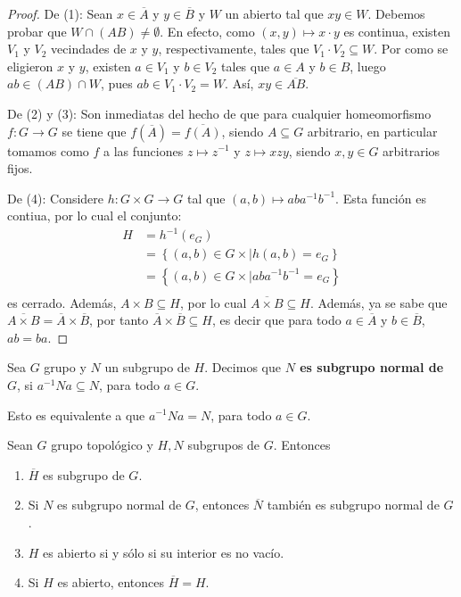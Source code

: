 \documentclass[12pt]{report}
\theoremstyle{largebreak}
\newcommand{\cf}[3]{\ensuremath{#1:#2\rightarrow#3}}
\newcommand{\Cls}[1]{\ensuremath{\overline{#1}}}
\begin{document}
    \begin{proof}
        De (1): Sean $x\in \Cls{A}$ y $y\in \Cls{B}$ y $W$ un abierto tal que $xy\in W$. Debemos probar que $W\cap (AB)\neq\emptyset$. En efecto, como $(x,y)\mapsto x\cdot y$ es continua, existen $V_1$ y $V_2$ vecindades de $x$ y $y$, respectivamente, tales que $V_1\cdot V_2\subseteq W$. Por como se eligieron $x$ y $y$, existen $a\in V_1$ y $b\in V_2$ tales que $a\in A$ y $b\in B$, luego $ab\in (AB)\cap W$, pues $ab\in V_1\cdot V_2=W$. Así, $xy\in \Cls{AB}$.

        De (2) y (3): Son inmediatas del hecho de que para cualquier homeomorfismo $\cf{f}{G}{G}$ se tiene que $f(\Cls{A})=\Cls{f(A)}$, siendo $A\subseteq G$ arbitrario, en particular tomamos como $f$ a las funciones $z\mapsto z^{-1}$ y $z\mapsto xzy$, siendo $x,y\in G$ arbitrarios fijos.

        De (4): Considere $\cf{h}{G\times G}{G}$ tal que $(a,b)\mapsto aba^{-1}b^{-1}$. Esta función es contiua, por lo cual el conjunto:
        \begin{equation*}
            \begin{split}
                H&= h^{-1}(e_G)\\
                &=\left\{(a,b)\in G\times\Big| h(a,b)=e_G \right\}\\
                &=\left\{(a,b)\in G\times\Big| aba^{-1}b^{-1}=e_G \right\}\\
            \end{split}
        \end{equation*}
        es cerrado. Además, $A\times B\subseteq H$, por lo cual $\Cls{A\times B} \subseteq H$. Además, ya se sabe que $\Cls{A\times B}=\Cls{A}\times \Cls{B}$, por tanto $\Cls{A}\times\Cls{B}\subseteq H$, es decir que para todo $a\in\Cls{A}$ y $b\in\Cls{B}$, $ab=ba$.
    \end{proof}

    \begin{mydef}
        Sea $G$ grupo y $N$ un subgrupo de $H$. Decimos que \textbf{$N$ es subgrupo normal de $G$}, si $a^{-1}Na\subseteq N$, para todo $a\in G$.

        Esto es equivalente a que $a^{-1}Na=N$, para todo $a\in G$.
    \end{mydef}

    \begin{propo}
        Sean $G$ grupo topológico y $H,N$ subgrupos de $G$. Entonces
        \begin{enumerate}
            \item $\Cls{H}$ es subgrupo de $G$.
            \item Si $N$ es subgrupo normal de $G$, entonces $\Cls{N}$ también es subgrupo normal de $G$.
            \item $H$ es abierto si y sólo si su interior es no vacío.
            \item Si $H$ es abierto, entonces $\Cls{H}=H$.
        \end{enumerate}
    \end{propo}
\end{document}
